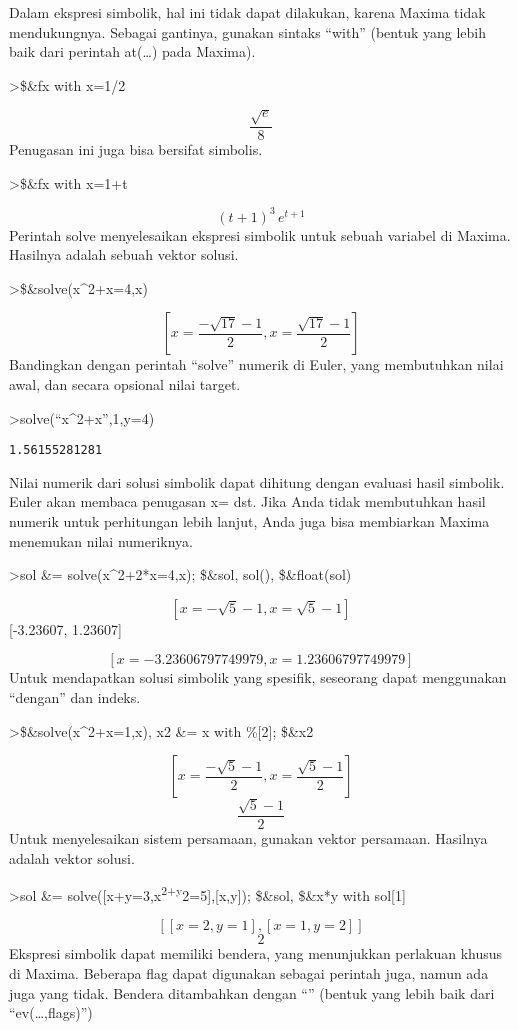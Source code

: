 \documentclass[
]{book}
\begin{document}
Dalam ekspresi simbolik, hal ini tidak dapat dilakukan, karena Maxima tidak mendukungnya. Sebagai gantinya, gunakan sintaks ``with'' (bentuk yang lebih baik dari perintah at(\ldots) pada Maxima).

\textgreater\$\&fx with x=1/2

\[\frac{\sqrt{e}}{8}\]Penugasan ini juga bisa bersifat simbolis.

\textgreater\$\&fx with x=1+t

\[\left(t+1\right)^3\,e^{t+1}\]Perintah solve menyelesaikan ekspresi simbolik untuk sebuah variabel di Maxima. Hasilnya adalah sebuah vektor solusi.

\textgreater\$\&solve(x\^{}2+x=4,x)

\[\left[ x=\frac{-\sqrt{17}-1}{2} , x=\frac{\sqrt{17}-1}{2} \right] \]Bandingkan dengan perintah ``solve'' numerik di Euler, yang membutuhkan nilai awal, dan secara opsional nilai target.

\textgreater solve(``x\^{}2+x'',1,y=4)

\begin{verbatim}
1.56155281281
\end{verbatim}

Nilai numerik dari solusi simbolik dapat dihitung dengan evaluasi hasil simbolik. Euler akan membaca penugasan x= dst. Jika Anda tidak membutuhkan hasil numerik untuk perhitungan lebih lanjut, Anda juga bisa membiarkan Maxima menemukan nilai numeriknya.

\textgreater sol \&= solve(x\^{}2+2*x=4,x); \$\&sol, sol(), \$\&float(sol)

\[\left[ x=-\sqrt{5}-1 , x=\sqrt{5}-1 \right] \] {[}-3.23607, 1.23607{]}

\[\left[ x=-3.23606797749979 , x=1.23606797749979 \right] \]Untuk mendapatkan solusi simbolik yang spesifik, seseorang dapat menggunakan ``dengan'' dan indeks.

\textgreater\$\&solve(x\^{}2+x=1,x), x2 \&= x with \%{[}2{]}; \$\&x2

\[\left[ x=\frac{-\sqrt{5}-1}{2} , x=\frac{\sqrt{5}-1}{2} \right] \]\[\frac{\sqrt{5}-1}{2}\]Untuk menyelesaikan sistem persamaan, gunakan vektor persamaan. Hasilnya adalah vektor solusi.

\textgreater sol \&= solve({[}x+y=3,x\textsuperscript{2+y}2=5{]},{[}x,y{]}); \$\&sol, \$\&x*y with sol{[}1{]}

\[\left[ \left[ x=2 , y=1 \right]  , \left[ x=1 , y=2 \right] 
  \right] \]\[2\]Ekspresi simbolik dapat memiliki bendera, yang menunjukkan perlakuan khusus di Maxima. Beberapa flag dapat digunakan sebagai perintah juga, namun ada juga yang tidak. Bendera ditambahkan dengan ``\textbar{}'' (bentuk yang lebih baik dari ``ev(\ldots,flags)'')
\end{document}
